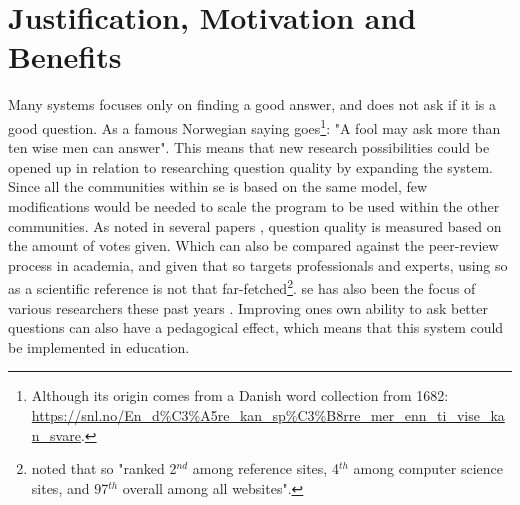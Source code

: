 \section{Justification, Motivation and Benefits}
\label{sec:justification}
Many systems focuses only on finding a good answer, and does not ask if it is a good question.
As a famous Norwegian saying goes\footnote{
	Although its origin comes from a Danish word collection from 1682: \\
	\url{https://snl.no/En\_d\%C3\%A5re\_kan\_sp\%C3\%B8rre\_mer\_enn\_ti\_vise\_kan\_svare}.
}: "A fool may ask more than ten wise men can answer".
This means that new research possibilities could be opened up in relation to researching question quality by expanding the system. 
Since all the communities within \gls{se} is based on the same model, few modifications would be needed to scale the program to be used within the other communities.
As noted in several papers \cite{Movshovitz-Attias2013, Nasehi2012, Posnett2012, M.Sewak2010, Treude2011, Yang2014}, question quality is measured based on the amount of votes given. 
Which can also be compared against the peer-review process in academia, and given that \gls{so} targets professionals and experts, 
using \gls{so} as a scientific reference is not that far-fetched\footnote{
	 \textcite[p.~1]{Posnett2012} noted that \gls{so} "ranked 2$^{nd}$ among reference sites, 4$^{th}$ among computer science sites, and 97$^{th}$ overall among all websites".
	 }.
\gls{se} has also been the focus of various researchers these past years \cite{Vasilescu2012}.
Improving ones own ability to ask better questions can also have a pedagogical effect, which means that this system could be implemented in education. 

